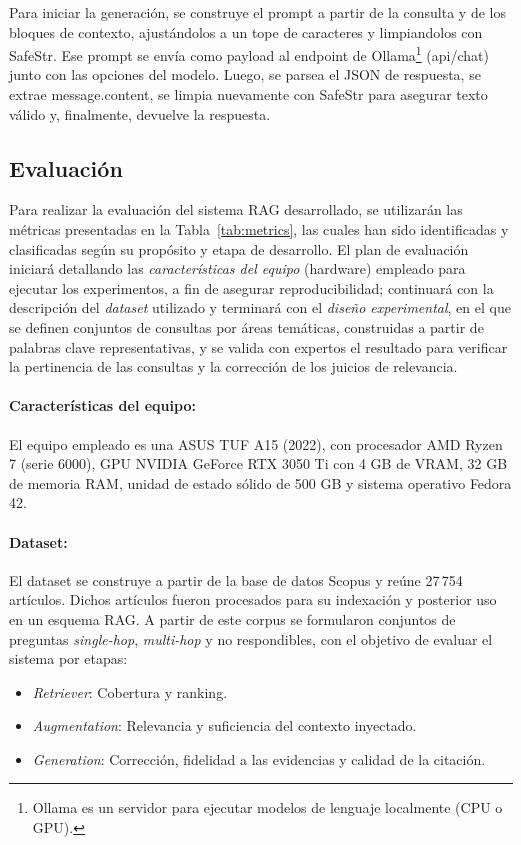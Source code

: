 Para iniciar la generación, se construye el prompt a partir de la consulta y de los bloques de contexto, ajustándolos a un tope de caracteres y limpiandolos con SafeStr. 
Ese prompt se envía como payload al endpoint de Ollama\footnote{Ollama es un servidor para ejecutar modelos de lenguaje localmente (CPU o GPU).} 
(api/chat) junto con las opciones del modelo.
Luego, se parsea el JSON de respuesta, se extrae message.content, se limpia nuevamente con SafeStr para asegurar texto válido
y, finalmente, devuelve la respuesta.


\subsection{Evaluación}\label{subsec:evaluacion}
Para realizar la evaluación del sistema RAG desarrollado, se utilizarán las métricas presentadas en la Tabla~\ref{tab:metrics},
las cuales han sido identificadas y clasificadas según su propósito y etapa de desarrollo.
El plan de evaluación iniciará detallando las \textit{características del equipo} (hardware) empleado para ejecutar
los experimentos, a fin de asegurar reproducibilidad; continuará con la descripción del \textit{dataset} utilizado
y terminará con el \textit{diseño experimental}, en el que se definen conjuntos de consultas por áreas temáticas,
construidas a partir de palabras clave representativas, y se valida con expertos el resultado
para verificar la pertinencia de las consultas y la corrección de los juicios
de relevancia.

\paragraph{Características del equipo:} El equipo empleado es una ASUS TUF A15 (2022),
con procesador AMD Ryzen 7 (serie 6000), GPU NVIDIA GeForce RTX 3050 Ti con 4 GB de VRAM, 32 GB de memoria
RAM, unidad de estado sólido de 500 GB y sistema operativo Fedora 42.

\paragraph{Dataset:} El dataset se construye a partir de la base de datos Scopus y reúne 27\,754 artículos.
Dichos artículos fueron procesados para su indexación y posterior uso en un esquema RAG. A partir de este corpus se
formularon conjuntos de preguntas \textit{single-hop}, \textit{multi-hop} y no respondibles, con el objetivo de evaluar
el sistema por etapas:
\begin{itemize}[leftmargin=*, itemsep=0.25em]
    \item \textit{Retriever}: Cobertura y ranking.
    \item \textit{Augmentation}: Relevancia y suficiencia del contexto inyectado.
    \item \textit{Generation}: Corrección, fidelidad a las evidencias y calidad de la citación.
\end{itemize}

